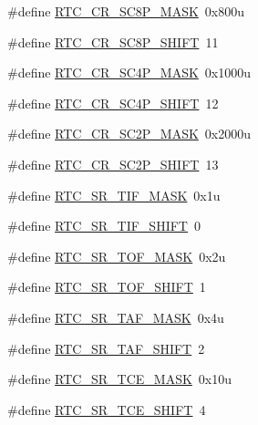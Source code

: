 \begin{DoxyCompactItemize}
\item 
\#define \hyperlink{group___r_t_c___register___masks_gac8a4d2f3837af6cea3924682d6d795c9}{R\+T\+C\+\_\+\+C\+R\+\_\+\+S\+C8\+P\+\_\+\+M\+A\+SK}~0x800u
\item 
\#define \hyperlink{group___r_t_c___register___masks_ga4bb07384fbca5f19f9e7b30daa071b92}{R\+T\+C\+\_\+\+C\+R\+\_\+\+S\+C8\+P\+\_\+\+S\+H\+I\+FT}~11
\item 
\#define \hyperlink{group___r_t_c___register___masks_gaf39585370663a36a6eba4dd1fe61534f}{R\+T\+C\+\_\+\+C\+R\+\_\+\+S\+C4\+P\+\_\+\+M\+A\+SK}~0x1000u
\item 
\#define \hyperlink{group___r_t_c___register___masks_ga348565e2fabae104ce15d3b0e23b4fc1}{R\+T\+C\+\_\+\+C\+R\+\_\+\+S\+C4\+P\+\_\+\+S\+H\+I\+FT}~12
\item 
\#define \hyperlink{group___r_t_c___register___masks_ga7eb15eb098b99b007a0fef42c3fef848}{R\+T\+C\+\_\+\+C\+R\+\_\+\+S\+C2\+P\+\_\+\+M\+A\+SK}~0x2000u
\item 
\#define \hyperlink{group___r_t_c___register___masks_gacd1a88b76256f8efc3633459f3c21d83}{R\+T\+C\+\_\+\+C\+R\+\_\+\+S\+C2\+P\+\_\+\+S\+H\+I\+FT}~13
\item 
\#define \hyperlink{group___r_t_c___register___masks_ga1efc73171f80fa079f4d3aec43f2faab}{R\+T\+C\+\_\+\+S\+R\+\_\+\+T\+I\+F\+\_\+\+M\+A\+SK}~0x1u
\item 
\#define \hyperlink{group___r_t_c___register___masks_ga261718ed362a6c56ad4c0e1c5e624552}{R\+T\+C\+\_\+\+S\+R\+\_\+\+T\+I\+F\+\_\+\+S\+H\+I\+FT}~0
\item 
\#define \hyperlink{group___r_t_c___register___masks_gabadca56816c485ca12134cd54a40c010}{R\+T\+C\+\_\+\+S\+R\+\_\+\+T\+O\+F\+\_\+\+M\+A\+SK}~0x2u
\item 
\#define \hyperlink{group___r_t_c___register___masks_ga209c228a9376a460fa905e67716ebe65}{R\+T\+C\+\_\+\+S\+R\+\_\+\+T\+O\+F\+\_\+\+S\+H\+I\+FT}~1
\item 
\#define \hyperlink{group___r_t_c___register___masks_ga8deec41a2823788375ed7b8b63870868}{R\+T\+C\+\_\+\+S\+R\+\_\+\+T\+A\+F\+\_\+\+M\+A\+SK}~0x4u
\item 
\#define \hyperlink{group___r_t_c___register___masks_gaaae3f647015906bacdb13124a50d3cfb}{R\+T\+C\+\_\+\+S\+R\+\_\+\+T\+A\+F\+\_\+\+S\+H\+I\+FT}~2
\item 
\#define \hyperlink{group___r_t_c___register___masks_gabcb29faa7aa3cee888e06e6b08236907}{R\+T\+C\+\_\+\+S\+R\+\_\+\+T\+C\+E\+\_\+\+M\+A\+SK}~0x10u
\item 
\#define \hyperlink{group___r_t_c___register___masks_ga120f7d25fec9feca0a62b6e79683e3ac}{R\+T\+C\+\_\+\+S\+R\+\_\+\+T\+C\+E\+\_\+\+S\+H\+I\+FT}~4

\end{DoxyCompactItemize}
